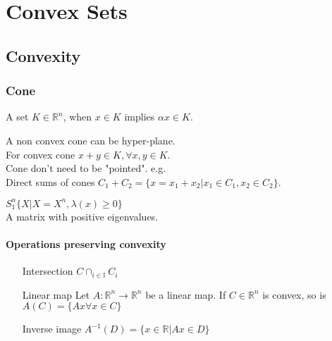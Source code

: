 \documentclass[11pt,fleqn]{book} %
\def\R{\mathbb{R}}
\begin{document}
\pagestyle{fancy} %


\chapter{Convex Sets}
\section{Convexity}
\subsection{Cone}
\begin{definition}[Cone]
A set $K \in \R^n$, when $x \in K $ implies $\alpha x \in K$.
\end{definition}
A non convex cone can be hyper-plane.\\
For convex cone $x + y \in K, \forall x,y \in K$.\\
Cone don't need to be "pointed". e.g. \\
Direct sums of cones $C_1 + C_2 = \{ x = x_1+x_2 | x_1 \in C_1, x_2 \in C_2 \}$.\\
\begin{example}
$S_1^n  \{ X | X=X^n ,\lambda(x) \ge 0\}$\\
A matrix with positive eigenvalues.
\end{example}

\subsubsection{Operations preserving convexity}
\begin{itemize}
\item[Intersection] $C  \cap_{i \in \mathbb{I}}C_i$
\item[Linear map] Let $A : \mathbb{R}^n \to  \R^n$ be a linear map. If $C \in \R^n$ is convex, so is $A(C) = \{Ax \forall x \in C \}$
\item[Inverse image] $A^{-1}(D) = \{ x \in \R |Ax \in D \}$
\end{itemize}
\end{document}
